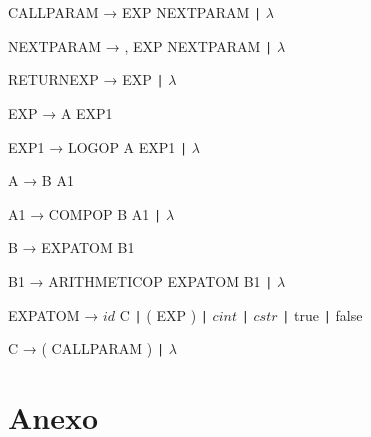 \documentclass{article}
\begin{document}
\begin{tcolorbox}[title=Gramática de Contexto Libre]
    \hspace{0.5cm} CALLPARAM → EXP NEXTPARAM \texttt{|} \( \lambda \)
    
    \hspace{0.5cm} NEXTPARAM → , EXP NEXTPARAM \texttt{|} \( \lambda \)
    
    \hspace{0.5cm} RETURNEXP → EXP \texttt{|} \( \lambda \)
    
    \hspace{0.5cm} EXP → A EXP1
    
    \hspace{0.5cm} EXP1 → LOGOP A EXP1 \texttt{|} \( \lambda \)
    
    \hspace{0.5cm} A → B A1
    
    \hspace{0.5cm} A1 → COMPOP B A1 \texttt{|} \( \lambda \)
    
    \hspace{0.5cm} B → EXPATOM B1
    
    \hspace{0.5cm} B1 → ARITHMETICOP EXPATOM B1 \texttt{|} \( \lambda \)
    
    \hspace{0.5cm} EXPATOM → $id$ C \texttt{|} ( EXP ) \texttt{|} $cint$ \texttt{|} $cstr$ \texttt{|} true \texttt{|} false
    
    \hspace{0.5cm} C → ( CALLPARAM ) \texttt{|} \( \lambda \)
\end{tcolorbox}


\newpage

\appendix
\section*{Anexo}

\end{document}
